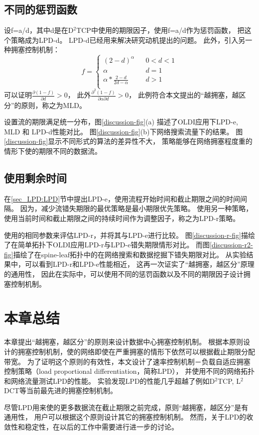 \subsection{不同的惩罚函数}
设f=a/d，其中d是在D$^2$TCP中使用的期限因子，使用f=a/d作为惩罚函数，
把这个策略成为LPD-d。
LPD-d已经用来解决研究动机提出的问题。
此外，引入另一种拥塞控制机制：
$$ f=\left\{
\begin{array}{rcl}
(2-d)^\alpha      &      & {0      <d      <1}\\
\alpha    &      & {d=1}\\
\alpha*\frac{2-d}{2d-\alpha}     &      & {d>1}\\
\end{array} \right. $$
可以证明$\frac{\partial{(1-f)}}{\partial{d}}>0$， 此外$\frac{\partial^{2}{(1-f)}}{\partial{\alpha}\partial{d}}>0$，
此例符合本文提出的“越拥塞，越区分”的原则，称之为MLD。


设置流的期限满足统一分布，图\ref{discussion-fig}(a) 描述了OLDI应用下LPD-e, MLD 和 LPD-d性能对比。
图\ref{discussion-fig}(b)下网络搜索流量下的结果。
图\ref{discussion-fig}显示不同形式的算法的差异性不大，
策略能够在网络拥塞程度重的情形下使的期限不同的数据流。

\subsection{使用剩余时间}

在\ref{sec_LPD:LPD}节中提出LPD-e，使用流程开始时间和截止期限之间的时间间隔。
因为，减少流错失期限的最优策略是最小期限优先策略。 
使用另一种策略，使用当前时间和截止期限之间的持续时间作为调整因子，称之为LPD-r策略。
 
 
使用的相同参数来评估LPD-r，并将其与LPD-e进行比较。
 图\ref{discussion-r-fig}描绘了在简单拓扑下OLDI应用LPD-r与LPD-e错失期限情形对比。
 而图\ref{discussion-r2-fig}描绘了在spine-leaf拓扑中的在网络搜索和数据挖掘下错失期限对比。
从实验结果中，可以看到LPD-r和LPD-e性能相近，
这再一次证实了“越拥塞，越区分”原理的通用性，
因此在实际中，可以使用不同的惩罚函数以及不同的期限因子设计拥塞控制机制。

\section{本章总结}
\label{sec_LPD:Conclusion}
本章提出“越拥塞，越区分”的原则来设计数据中心拥塞控制机制。
根据本原则设计的拥塞控制机制，使的网络即使在严重拥塞的情形下依然可以根据截止期限分配带宽。
为了证明这个原则的有效性，本文设计了速率控制机制－负载自适应拥塞控制策略（load proportional differentiation，简称LPD），
并使用不同的网络拓扑和网络流量测试LPD的性能。
实验发现LPD的性能几乎超越了例如D$^{2}$TCP, L$^{2}$DCT等当前最先进的拥塞控制机制。

尽管LPD用来使的更多数据流在截止期限之前完成，原则“越拥塞，越区分”是有通用性，
用户可以根据这个原则设计其它的拥塞控制机制。
然而，关于LPD的收敛性和稳定性，在以后的工作中需要进行进一步的讨论。


